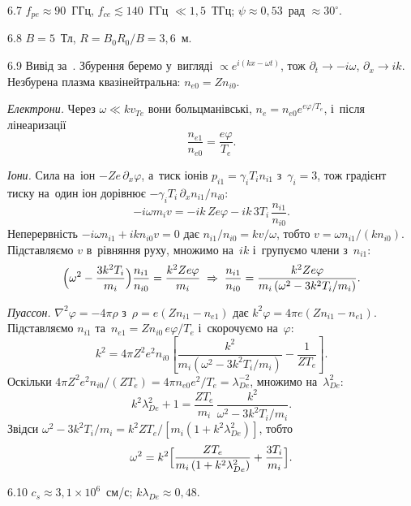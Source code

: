 \begin{Solution}{6.{7}}
		$f_{pe}\approx90$~ГГц, $f_{ce}\lesssim140$~ГГц $\ll1{,}5$~ТГц; $\psi\approx0{,}53$~рад $\approx30^\circ$.
	
\end{Solution}
\begin{Solution}{6.{8}}
		$B=5$~Тл, $R=B_0R_0/B=3{,}6$~м.
	
\end{Solution}
\begin{Solution}{6.{9}}
		Вивід за~\cite{chen2016introduction}. Збурення беремо у~вигляді $\propto e^{i(kx-\omega t)}$, тож
		$\partial_t\to-i\omega$, $\partial_x\to ik$. Незбурена плазма квазінейтральна: $n_{e0}=Zn_{i0}$.

		\emph{Електрони.} Через $\omega\ll kv_{Te}$ вони больцманівські, $n_e=n_{e0}e^{e\varphi/T_e}$, і~після
		лінеаризації
		\begin{equation*}
			\frac{n_{e1}}{n_{e0}}=\frac{e\varphi}{T_e}.
		\end{equation*}

		\emph{Іони.} Сила на~іон $-Ze\,\partial_x\varphi$, а~тиск іонів $p_{i1}=\gamma_iT_in_{i1}$ з~$\gamma_i=3$, тож
		градієнт тиску на~один іон дорівнює $-\gamma_iT_i\,\partial_xn_{i1}/n_{i0}$:
		\begin{equation*}
			-i\omega m_iv=-ik\,Ze\varphi-ik\,3T_i\,\frac{n_{i1}}{n_{i0}}.
		\end{equation*}
		Неперервність $-i\omega n_{i1}+ikn_{i0}v=0$ дає $n_{i1}/n_{i0}=kv/\omega$, тобто $v=\omega n_{i1}/(kn_{i0})$.
		Підставляємо $v$ в~рівняння руху, множимо на~$ik$ і~групуємо члени з~$n_{i1}$:
		\begin{equation*}
			\Bigl(\omega^2-\frac{3k^2T_i}{m_i}\Bigr)\frac{n_{i1}}{n_{i0}}=\frac{k^2Ze\varphi}{m_i}
			\;\Rightarrow\;
			\frac{n_{i1}}{n_{i0}}=\frac{k^2Ze\varphi}{m_i\,(\omega^2-3k^2T_i/m_i)}.
		\end{equation*}

		\emph{Пуассон.} $\nabla^2\varphi=-4\pi\rho$ з~$\rho=e(Zn_{i1}-n_{e1})$ дає $k^2\varphi=4\pi e(Zn_{i1}-n_{e1})$.
		Підставляємо $n_{i1}$ та~$n_{e1}=Zn_{i0}\,e\varphi/T_e$ і~скорочуємо на~$\varphi$:
		\begin{equation*}
			k^2=4\pi Z^2e^2n_{i0}\left[\frac{k^2}{m_i(\omega^2-3k^2T_i/m_i)}-\frac1{ZT_e}\right].
		\end{equation*}
		Оскільки $4\pi Z^2e^2n_{i0}/(ZT_e)=4\pi n_{e0}e^2/T_e=\lambda_{De}^{-2}$, множимо на~$\lambda_{De}^2$:
		\begin{equation*}
			k^2\lambda_{De}^2+1=\frac{ZT_e}{m_i}\,\frac{k^2}{\omega^2-3k^2T_i/m_i}.
		\end{equation*}
		Звідси $\omega^2-3k^2T_i/m_i=k^2ZT_e/[m_i(1+k^2\lambda_{De}^2)]$, тобто
		\begin{equation*}
			\omega^2=k^2\Bigl[\frac{ZT_e}{m_i\,(1+k^2\lambda_{De}^2)}+\frac{3T_i}{m_i}\Bigr].
		\end{equation*}
	
\end{Solution}
\begin{Solution}{6.{10}}
		$c_s\approx3{,}1\times10^{6}$~см/с; $k\lambda_{De}\approx0{,}48$.
	
\end{Solution}
